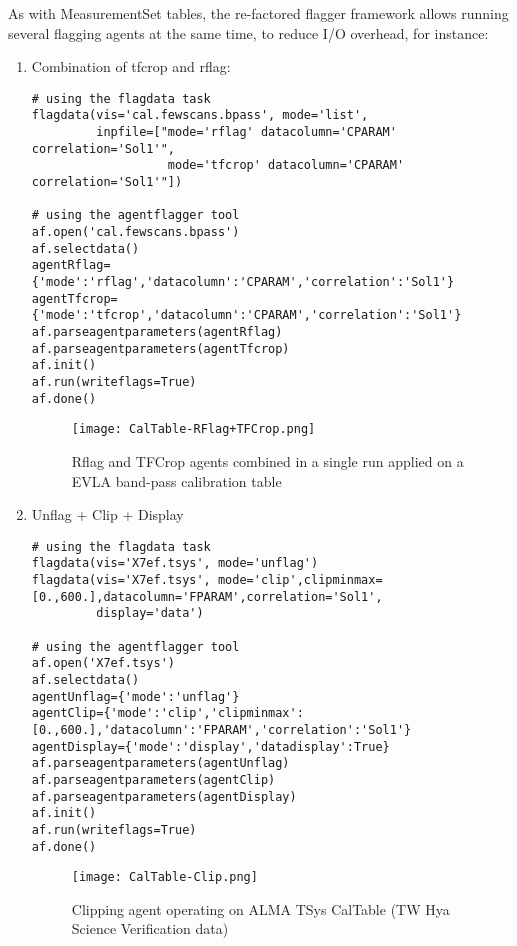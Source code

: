 As with MeasurementSet tables, the re-factored flagger framework allows running
several flagging agents at the same time, to reduce I/O overhead,  for instance:

\begin{enumerate}

\item Combination of tfcrop and rflag:

\begin{verbatim}
# using the flagdata task
flagdata(vis='cal.fewscans.bpass', mode='list', 
         inpfile=["mode='rflag' datacolumn='CPARAM' correlation='Sol1'",
                   mode='tfcrop' datacolumn='CPARAM' correlation='Sol1'"])

# using the agentflagger tool
af.open('cal.fewscans.bpass')
af.selectdata()
agentRflag={'mode':'rflag','datacolumn':'CPARAM','correlation':'Sol1'}
agentTfcrop={'mode':'tfcrop','datacolumn':'CPARAM','correlation':'Sol1'}
af.parseagentparameters(agentRflag)
af.parseagentparameters(agentTfcrop)
af.init()
af.run(writeflags=True)
af.done()

\end{verbatim}

\begin{figure}
\texttt{[image: CalTable-RFlag+TFCrop.png]}
\caption{Rflag and TFCrop agents combined in a single run applied on a EVLA
band-pass calibration table}
\label{Fig:EVLA Band Pass Cal Table RFlag+TFCrop applied combined}
\end{figure}

\item Unflag + Clip + Display

\begin{verbatim}
# using the flagdata task
flagdata(vis='X7ef.tsys', mode='unflag')
flagdata(vis='X7ef.tsys', mode='clip',clipminmax=[0.,600.],datacolumn='FPARAM',correlation='Sol1',
         display='data')

# using the agentflagger tool
af.open('X7ef.tsys')
af.selectdata()
agentUnflag={'mode':'unflag'}
agentClip={'mode':'clip','clipminmax':[0.,600.],'datacolumn':'FPARAM','correlation':'Sol1'}
agentDisplay={'mode':'display','datadisplay':True}
af.parseagentparameters(agentUnflag)
af.parseagentparameters(agentClip)
af.parseagentparameters(agentDisplay)
af.init()
af.run(writeflags=True)
af.done()

\end{verbatim}

\begin{figure}
\texttt{[image: CalTable-Clip.png]}
\caption{Clipping agent operating on ALMA TSys CalTable (TW Hya Science
Verification data)}
\label{Fig:TW Hya CalTable Clip}
\end{figure}


\end{enumerate}
